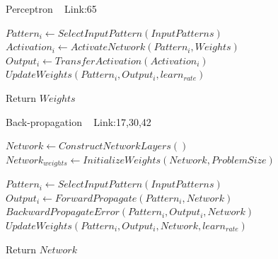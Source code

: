 \documentclass[a4paper]{article}
\begin{document}
  \begin{algorithm}
   \caption{Perceptron ~\cite{perceptron1} Link:{65}}
    \begin{algorithmic}[1]
    
            \State $Pattern_i \leftarrow SelectInputPattern(InputPatterns)$
            \State $Activation_i \leftarrow ActivateNetwork(Pattern_i,Weights)$
            \State $Output_i \leftarrow TransferActivation(Activation_i)$
            \State $UpdateWeights(Pattern_i,Output_i,learn_{rate})$
        \EndFor
        
       
       \State Return $Weights$



 

\end{algorithmic}
\end{algorithm}


  \begin{algorithm}
   \caption{Back-propagation  ~\cite{backpropagation12} Link:17,30,42}
    \begin{algorithmic}[1]
     \State $Network \leftarrow ConstructNetworkLayers()$
     \State $Network_{weights} \leftarrow InitializeWeights(Network,ProblemSize)$
    
            \State $Pattern_i \leftarrow SelectInputPattern(InputPatterns)$
            \State $Output_i \leftarrow ForwardPropagate(Pattern_i,Network)$
            \State $BackwardPropagateError(Pattern_i,Output_i,Network)$
            \State $UpdateWeights(Pattern_i,Output_i,Network,learn_{rate})$
        \EndFor
        
       
       \State Return $Network$



 

\end{algorithmic}
\end{algorithm}
\end{document}
